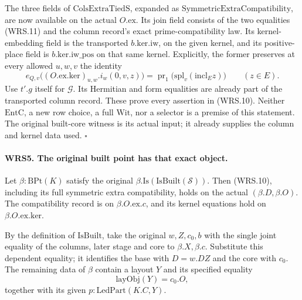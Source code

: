 \documentclass[11pt,a4paper]{article}
\numberwithin{equation}{section}
\theoremstyle{remark}\newtheorem{remark}[theorem]{Remark}
\begin{document}
The three fields of \(\mathrm{ColsExtraTiedS}\), expanded as
\(\mathrm{SymmetricExtraCompatibility}\), are now available on
the actual \(O.\mathrm{ex}\).  Its join field consists of the two
equalities (WRS.11) and the column record's exact prime-compatibility
law.  Its kernel-embedding field is the transported
\(b.\mathrm{ker.iw}\), on the given kernel, and its positive-place
field is \(b.\mathrm{ker.iw\_\allowbreak pos}\) on that same kernel.  Explicitly,
the former preserves at every allowed \(u,w,v\) the identity
\[
 e_{Q,v}\bigl((O.\mathrm{ex.ker})_{u,w}.i_w(0,v,z)\bigr)
   =\operatorname{pr}_1\bigl(\mathrm{spl}_v(\mathrm{incl}_E z)\bigr)
       \qquad(z\in E).                              \tag{WRS.12}
\]
Use \(t'.g\) itself for \(\mathcal G\).  Its Hermitian and form
equalities are already part of the transported column record.
These prove every assertion in (WRS.10).  Neither \(\mathrm{EntC}\),
a new row choice, a full \(\mathrm{Wit}\), nor a selector is a
premise of this statement.  The original built-core witness is its
actual input; it already supplies the column and kernel data used.
\hfill\(\square\)

\paragraph{WRS5. The original built point has that exact object.}
\label{claim:WRS5}
Let \(\beta:\mathrm{BPt}(K)\) satisfy the original
\(\beta.\mathrm{Is}(\mathrm{IsBuilt}(\mathcal S))\).
Then (WRS.10), including its full symmetric extra compatibility,
holds on the actual \((\beta.D,\beta.O)\).
The compatibility record is on \(\beta.O.\mathrm{ex}.c\), and
its kernel equations hold on \(\beta.O.\mathrm{ex.ker}\).

By the definition of \(\mathrm{IsBuilt}\), take the original
\(w,Z,c_0,b\) with the single joint equality of the columns,
later stage and core to \(\beta.X,\beta.c\).  Substitute this
dependent equality; it identifies the base with \(D=w.DZ\)
and the core with \(c_0\).  The remaining data of \(\beta\)
contain a layout \(Y\) and its specified equality
\[
                 \mathrm{layObj}(Y)=c_0.O,
 \tag{WRS.13}
\]
together with its given \(p:\mathrm{LedPart}(K.C,Y)\).
\end{document}
